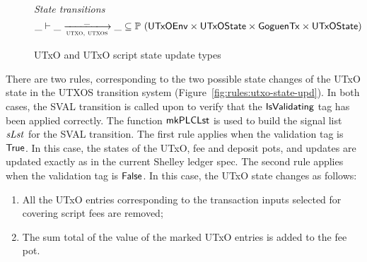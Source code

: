 \begin{figure}[htb]
  \emph{State transitions}
  \begin{equation*}
    \_ \vdash
    \var{\_} \trans{utxo, utxos}{\_} \var{\_}
    \subseteq \powerset (\UTxOEnv \times \UTxOState \times \GoguenTx \times \UTxOState)
  \end{equation*}
  \caption{UTxO and UTxO script state update types}
  \label{fig:ts-types:utxo-scripts}
\end{figure}

There are two rules, corresponding to the two possible state changes of the
UTxO state in the UTXOS transition system (Figure~\ref{fig:rules:utxo-state-upd}).
%
In both cases, the SVAL transition is called upon to verify that the $\mathsf{IsValidating}$
tag has been applied correctly. The function $\mathsf{mkPLCLst}$ is used to build
the signal list $\mathit{sLst}$ for the SVAL transition.
%
The first rule
applies when the validation tag is $\mathsf{True}$.
In this case, the states of the UTxO, fee
  and deposit pots, and updates are updated exactly as in the current Shelley
  ledger spec.
%
  The second rule
  applies when the validation tag is $\mathsf{False}$.
  In this case, the UTxO state changes as follows:

  \begin{enumerate}
    \item All the
    UTxO entries corresponding to the transaction inputs selected for covering
    script fees are removed;

    \item The sum total of the value of the marked UTxO entries
    is added to the fee pot.
  \end{enumerate}


